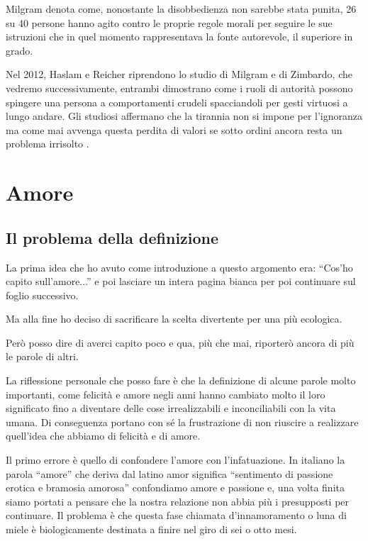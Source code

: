\documentclass[12pt]{book} %
\begin{document}
\begin{mdframed}[linewidth=1pt]
Milgram denota come, nonostante la disobbedienza non sarebbe stata punita, 26 su 40 persone hanno agito contro le
proprie regole morali per seguire le sue istruzioni che in quel momento rappresentava la fonte autorevole, il superiore
in grado.


\bigskip

Nel 2012, Haslam e Reicher riprendono lo studio di Milgram e di Zimbardo, che vedremo successivamente, entrambi
dimostrano come i ruoli di autorità possono spingere una persona a comportamenti crudeli spacciandoli per gesti
virtuosi a lungo andare. Gli studiosi affermano che la tirannia non si impone per l'ignoranza ma
come mai avvenga questa perdita di valori se sotto ordini ancora resta un problema
irrisolto
. 
\end{mdframed}

\clearpage\section{Amore}
\subsection{Il problema della definizione}
La prima idea che ho avuto come introduzione a questo argomento era: “Cos'ho capito
sull'amore...” e poi lasciare un intera pagina bianca per poi continuare sul foglio successivo.

Ma alla fine ho deciso di sacrificare la scelta divertente per una più ecologica.

Però posso dire di averci capito poco e qua, più che mai, riporterò ancora di più le parole di altri.


\bigskip

La riflessione personale che posso fare è che la definizione di alcune parole molto importanti, come felicità e amore
negli anni hanno cambiato molto il loro significato fino a diventare delle cose irrealizzabili e inconciliabili con la
vita umana. Di conseguenza portano con sé la frustrazione di non riuscire a realizzare quell'idea
che abbiamo di felicità e di amore.


\bigskip

Il primo errore è quello di confondere l'amore con l'infatuazione. In italiano
la parola “amore” che deriva dal latino amor significa “sentimento di passione erotica e bramosia amorosa” confondiamo
amore e passione e, una volta finita siamo portati a pensare che la nostra relazione non abbia più i presupposti per
continuare. Il problema è che questa fase chiamata d'innamoramento o luna di miele è
biologicamente destinata a finire nel giro di sei o otto mesi.
\end{document}
